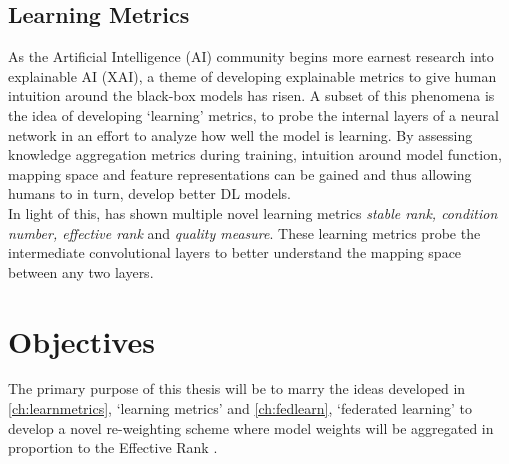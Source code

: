 \subsection{Learning Metrics}\label{ch:learnmetrics}
As the Artificial Intelligence (AI) community begins more earnest research into explainable AI (XAI), a theme of developing explainable metrics to give human intuition \cite{xai} around the black-box models has risen. A subset of this phenomena is the idea of developing `learning' metrics, to probe the internal layers of a neural network in an effort to analyze how well the model is learning. By assessing knowledge aggregation metrics during training, intuition around model function, mapping space and feature representations can be gained and thus allowing humans to in turn, develop better DL models. \\

In light of this, \cite{jaegerman21genprob} has shown multiple novel learning metrics \textit{stable rank, condition number, effective rank} and \textit{quality measure}. These learning metrics probe the intermediate convolutional layers to better understand the mapping space between any two layers.

\section{Objectives}
The primary purpose of this thesis will be to marry the ideas developed in \autoref{ch:learnmetrics}, `learning metrics' and  \autoref{ch:fedlearn}, `federated learning' to develop a novel re-weighting scheme where model weights will be aggregated in proportion to the Effective Rank \cite{jaegerman21genprob}.
